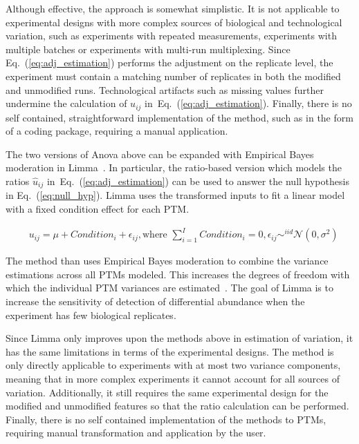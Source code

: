 \documentclass[mcp]{article}
\numberwithin{table}{section}
\def\eqref#1{Eq.~(\ref{eq:#1})}
\begin{document}
Although effective, the approach is somewhat simplistic. It is not applicable to experimental designs with more complex sources of biological and technological variation, such as experiments with repeated measurements, experiments with multiple batches or experiments with multi-run multiplexing. Since \eqref{adj_estimation} performs the adjustment on the replicate level, the experiment must contain a matching number of replicates in both the modified and unmodified runs. Technological artifacts such as missing values further undermine the calculation of $u_{ij}$ in~\eqref{adj_estimation}. Finally, there is no self contained, straightforward implementation of the method, such as in the form of a coding package, requiring a manual application.

\medskip {} 

\medskip \noindent The two versions of Anova above can be expanded with Empirical Bayes moderation in Limma~\cite{ Ritchie_15a, Schwammle2015, Smyth:2004, Smyth:2005, Zhu,Chappell:2021}. In particular, the ratio-based version which models the ratios $\hat{u}_{ij}$ in~\eqref{adj_estimation} can be used to answer the null hypothesis in \eqref{null_hyp}. Limma uses the transformed inputs to fit a linear model with a fixed condition effect for each PTM.

\begin{eqnarray}
& u_{ij} = \mu + Condition_i + \epsilon_{ij}, \text{where } \sum\limits_{i=1}^{I} Condition_i = 0, \epsilon_{ij} \mathop\sim^{iid} \mathcal{N}(0, \sigma^2)
\label{eq:limma_model}
\end{eqnarray}

The method than uses Empirical Bayes moderation to combine the variance estimations across all PTMs modeled. This increases the degrees of freedom with which the individual PTM variances are estimated~\cite{Ritchie_15a}. The goal of Limma is to increase the sensitivity of detection of differential abundance when the experiment has few biological replicates. 

Since Limma only improves upon the methods above in estimation of variation, it has the same limitations in terms of the experimental designs. The method is only directly applicable to experiments with at most two variance components, meaning that in more complex experiments it cannot account for all sources of variation. Additionally, it still requires the same experimental design for the modified and unmodified features so that the ratio calculation can be performed. Finally, there is no self contained implementation of the methods to PTMs, requiring manual transformation and application by the user.
\end{document}
